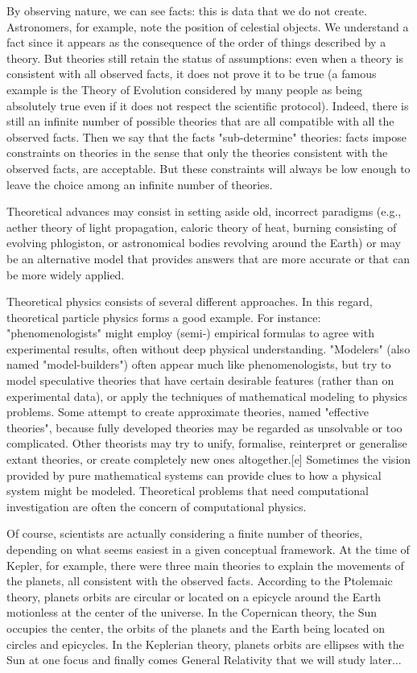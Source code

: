 	By observing nature, we can see facts: this is data that we do not create. Astronomers, for example, note the position of celestial objects. We understand a fact since it appears as the consequence of the order of things described by a theory. But theories still retain the status of assumptions: even when a theory is consistent with all observed facts, it does not prove it to be true (a famous example is the Theory of Evolution considered by many people as being absolutely true even if it does not respect the scientific protocol). Indeed, there is still an infinite number of possible theories that are all compatible with all the observed facts. Then we say that the facts "sub-determine" theories: facts impose constraints on theories in the sense that only the theories consistent with the observed facts, are acceptable. But these constraints will always be low enough to leave the choice among an infinite number of theories.
	
	Theoretical advances may consist in setting aside old, incorrect paradigms (e.g., aether theory of light propagation, caloric theory of heat, burning consisting of evolving phlogiston, or astronomical bodies revolving around the Earth) or may be an alternative model that provides answers that are more accurate or that can be more widely applied. 
	
	Theoretical physics consists of several different approaches. In this regard, theoretical particle physics forms a good example. For instance: "phenomenologists" might employ (semi-) empirical formulas to agree with experimental results, often without deep physical understanding. "Modelers" (also named "model-builders") often appear much like phenomenologists, but try to model speculative theories that have certain desirable features (rather than on experimental data), or apply the techniques of mathematical modeling to physics problems. Some attempt to create approximate theories, named "effective theories", because fully developed theories may be regarded as unsolvable or too complicated. Other theorists may try to unify, formalise, reinterpret or generalise extant theories, or create completely new ones altogether.[e] Sometimes the vision provided by pure mathematical systems can provide clues to how a physical system might be modeled. Theoretical problems that need computational investigation are often the concern of computational physics.
	
	Of course, scientists are actually considering a finite number of theories, depending on what seems easiest in a given conceptual framework. At the time of Kepler, for example, there were three main theories to explain the movements of the planets, all consistent with the observed facts. According to the Ptolemaic theory, planets orbits are circular or located on a epicycle around the Earth motionless at the center of the universe. In the Copernican theory, the Sun occupies the center, the orbits of the planets and the Earth being located on circles and epicycles. In the Keplerian theory, planets orbits are ellipses with the Sun at one focus and finally comes General Relativity that we will study later...
	
